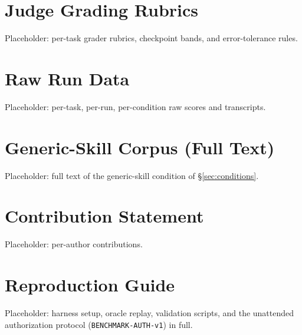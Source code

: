 \documentclass[11pt]{article}
\begin{document}
\section{Judge Grading Rubrics}
\label{app:rubrics}
Placeholder: per-task grader rubrics, checkpoint bands, and error-tolerance rules.

\section{Raw Run Data}
\label{app:raw}
Placeholder: per-task, per-run, per-condition raw scores and transcripts.

\section{Generic-Skill Corpus (Full Text)}
\label{app:generic}
Placeholder: full text of the generic-skill condition of \S\ref{sec:conditions}.

\section{Contribution Statement}
\label{app:contrib}
Placeholder: per-author contributions.

\section{Reproduction Guide}
\label{app:repro}
Placeholder: harness setup, oracle replay, validation scripts, and the unattended authorization protocol (\texttt{BENCHMARK-AUTH-v1}) in full.
\end{document}
